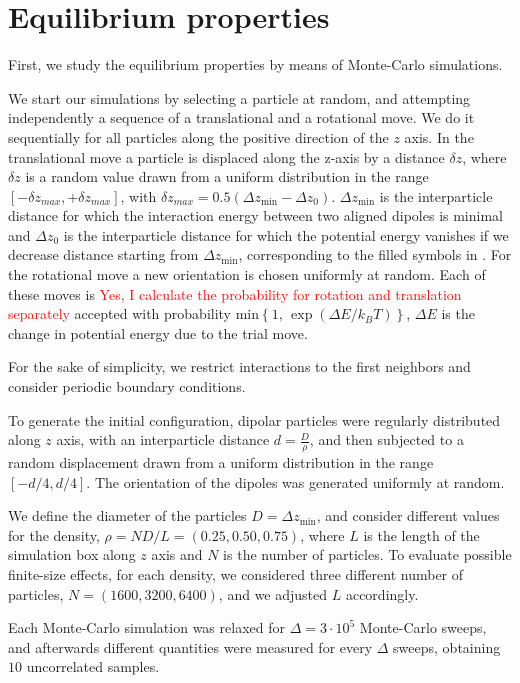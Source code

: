 \section{Equilibrium properties}

First, we study the equilibrium properties by means of Monte-Carlo simulations.

We start our simulations by selecting a particle at random, and attempting independently a sequence of a translational and a rotational move. We do it sequentially for all particles along the positive direction of the $z$ axis. In the translational move a particle is displaced along the z-axis by a distance $\delta z$, where $\delta z$ is a random value drawn from a uniform distribution in the range $[-\delta z_{max}, +\delta z_{max}]$, with $\delta z_{max} = 0.5 (\Delta z_\mathrm{min} - \Delta z_0)$. $\Delta z_\mathrm{min}$ is the interparticle distance for which the interaction energy between two aligned dipoles is minimal and $\Delta z_0$ is the interparticle distance for which the potential energy vanishes if we decrease distance starting from $\Delta z_\mathrm{min}$, corresponding to the filled symbols in . For the rotational move a new orientation is chosen uniformly at random. Each of these moves is \textcolor{red}{Yes, I calculate the probability for rotation and translation separately} accepted with probability $\mathrm{min} \left\{1, \, \exp(\Delta E / k_BT) \right\}$, $\Delta E$ is the change in potential energy due to the trial move.

For the sake of simplicity, we restrict interactions to the first neighbors and consider periodic boundary conditions.

To generate the initial configuration, dipolar particles were regularly distributed along $z$ axis, with an interparticle distance $d = \frac{D}{\rho}$, and then subjected to a random displacement drawn from a uniform distribution in the range $[-d/4, d/4]$. The orientation of the dipoles was generated uniformly at random.

We define the diameter of the particles $D=\Delta z_\mathrm{min}$, and consider different values for the density, $\rho= ND/L = \left(0.25, 0.50, 0.75\right)$, where $L$ is the length of the simulation box along $z$ axis and $N$ is the number of particles. To evaluate possible finite-size effects, for each density, we considered three different number of particles, $N = \left(1600, 3200, 6400 \right)$, and we adjusted $L$ accordingly.

Each Monte-Carlo simulation was relaxed for $\Delta = 3 \cdot 10^5$ Monte-Carlo sweeps, and afterwards different quantities were measured for every $\Delta$ sweeps, obtaining $10$ uncorrelated samples. 

